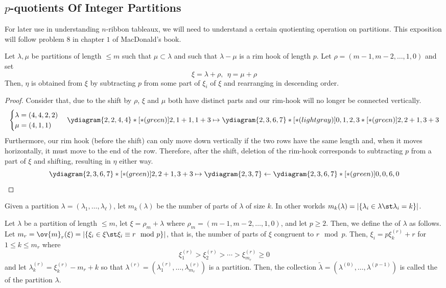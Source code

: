 \documentclass[11pt,leqno,oneside]{amsart}
\numberwithin{thm}{section}
\newcommand{\rowshift}{\rho}
\begin{document}
\subsection{\(p\)-quotients Of Integer Partitions}
For later use in understanding \(n\)-ribbon tableaux, we will need to
understand a certain quotienting operation on partitions. This
exposition will follow problem \(8\) in chapter \(1\) of MacDonald's
book.
\begin{prop}
  Let \(\lambda, \mu\) be partitions of length \(\leq m\) such that
  \(\mu \subset \lambda\) and such that \(\lambda-\mu\) is a rim
  hook of length \(p\). Let \(\rowshift = (m-1, m-2, \ldots, 1,0)\) and set \[
    \xi = \lambda + \rowshift, \ \ \eta = \mu + \rowshift
  \]
  Then, \(\eta\) is obtained from \(\xi\) by subtracting \(p\) from
  some part of \(\xi_i\) of \(\xi\) and rearranging in descending order.
\end{prop}
\begin{proof}
  Consider that, due to the shift by \(\rowshift\), \(\xi\) and
  \(\mu\) both have distinct parts and our rim-hook will no longer be
  connected vertically. \[
    \begin{cases}
      \lambda = (4,4,2,2)\\
      \mu = (4,1,1)
    \end{cases}
    \ydiagram{2,2,4,4}*[*(green)]{2,1+1,1+3} \mapsto
    \ydiagram{2,3,6,7}*[*(lightgray)]{0,1,2,3}*[*(green)]{2,2+1,3+3} 
  \]
  Furthermore, our rim hook (before the shift) can only move down vertically if the two
  rows have the same length and, when it moves horizontally, it must
  move to the end of the row. Therefore, after the shift, deletion
  of the rim-hook corresponds to subtracting \(p\) from a part of
  \(\xi\) and shifting, resulting in \(\eta\) either way. \[
    \ydiagram{2,3,6,7}*[*(green)]{2,2+1,3+3}
    \mapsto \ydiagram{2,3,7} \leftarrow \ydiagram{2,3,6,7}*[*(green)]{0,0,6,0}
  \]
\end{proof}
\begin{defn}
  Given a partition \(\lambda = (\lambda_1, \ldots, \lambda_\ell)\),
  let \(m_k(\lambda)\) be the number of parts of \(\lambda\) of size
  \(k\). In other workds \(m_k(\lambda) = |\{\lambda_i \in \lambda \st \lambda_i =
  k\}|\).
\end{defn}
\begin{defn}
  Let \(\lambda\) be a partition of length \(\leq m\), let \(\xi =
  \rowshift_m + \lambda\) where \(\rowshift_m = (m-1, m-2, \ldots, 1,
  0)\), and let \(p \geq 2\). Then, we define the 
  of \(\lambda\) as follows. \\

  Let \(m_r = \ov{m}_r(\xi) = |\{\xi_i \in \xi \st \xi_i \equiv r \mod
  p\}|\), that is, the number of parts of \(\xi\) congruent to \(r
  \mod p\). Then, \(\xi_i = p \xi_k^{(r)}+r\) for \(1 \leq k \leq
  m_r\) where \[
    \xi_1^{(r)} > \xi_2^{(r)} > \cdots > \xi_{m_r}^{(r)} \geq 0
  \]
  and let \(\lambda_k^{(r)} = \xi_k^{(r)}-m_r+k\) so that
  \(\lambda^{(r)} = (\lambda_1^{(r)}, \ldots, \lambda_{m_r}^{(r)})\)
  is a partition. Then, the collection \(\tilde{\lambda} =
  (\lambda^{(0)}, \ldots, \lambda^{(p-1)})\) is called the
   of the partition \(\lambda\).
\end{defn}
\end{document}
